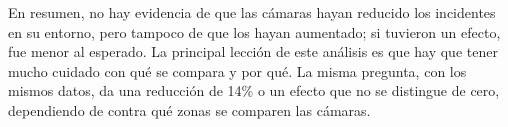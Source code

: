 En resumen, no hay evidencia de que las cámaras hayan reducido los incidentes en su entorno, pero tampoco de que los hayan aumentado; si tuvieron un efecto, fue menor al esperado. La principal lección de este análisis es que hay que tener mucho cuidado con qué se compara y por qué. La misma pregunta, con los mismos datos, da una reducción de 14\% o un efecto que no se distingue de cero, dependiendo de contra qué zonas se comparen las cámaras.
